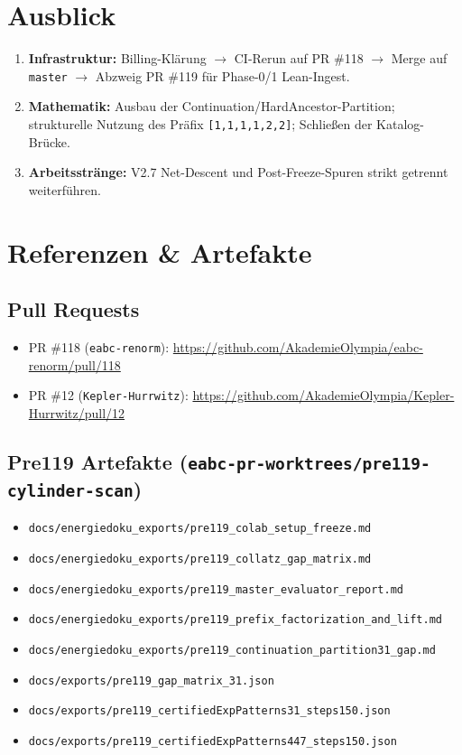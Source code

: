 \documentclass[11pt,a4paper]{article}
\theoremstyle{definition}
\theoremstyle{remark}
\begin{document}
	\section{Ausblick}
	
	\begin{enumerate}
		\item \textbf{Infrastruktur:} Billing-Klärung $\to$ CI-Rerun auf PR \#118 $\to$ Merge auf \texttt{master} $\to$ Abzweig PR \#119 für Phase-0/1 Lean-Ingest.
		\item \textbf{Mathematik:} Ausbau der Continuation/HardAncestor-Partition; strukturelle Nutzung des Präfix \texttt{[1,1,1,1,2,2]}; Schließen der Katalog-Brücke.
		\item \textbf{Arbeitsstränge:} V2.7 Net-Descent und Post-Freeze-Spuren strikt getrennt weiterführen.
	\end{enumerate}
	
	\section{Referenzen \& Artefakte}
	
	\subsection*{Pull Requests}
	\begin{itemize}
		\item PR \#118 (\texttt{eabc-renorm}): \url{https://github.com/AkademieOlympia/eabc-renorm/pull/118}
		\item PR \#12 (\texttt{Kepler-Hurrwitz}): \url{https://github.com/AkademieOlympia/Kepler-Hurrwitz/pull/12}
	\end{itemize}
	
	\subsection*{Pre119 Artefakte (\texttt{eabc-pr-worktrees/pre119-cylinder-scan})}
	\begin{itemize}
		\item \texttt{docs/energiedoku\_exports/pre119\_colab\_setup\_freeze.md}
		\item \texttt{docs/energiedoku\_exports/pre119\_collatz\_gap\_matrix.md}
		\item \texttt{docs/energiedoku\_exports/pre119\_master\_evaluator\_report.md}
		\item \texttt{docs/energiedoku\_exports/pre119\_prefix\_factorization\_and\_lift.md}
		\item \texttt{docs/energiedoku\_exports/pre119\_continuation\_partition31\_gap.md}
		\item \texttt{docs/exports/pre119\_gap\_matrix\_31.json}
		\item \texttt{docs/exports/pre119\_certifiedExpPatterns31\_steps150.json}
		\item \texttt{docs/exports/pre119\_certifiedExpPatterns447\_steps150.json}
	\end{itemize}
	
\end{document}
